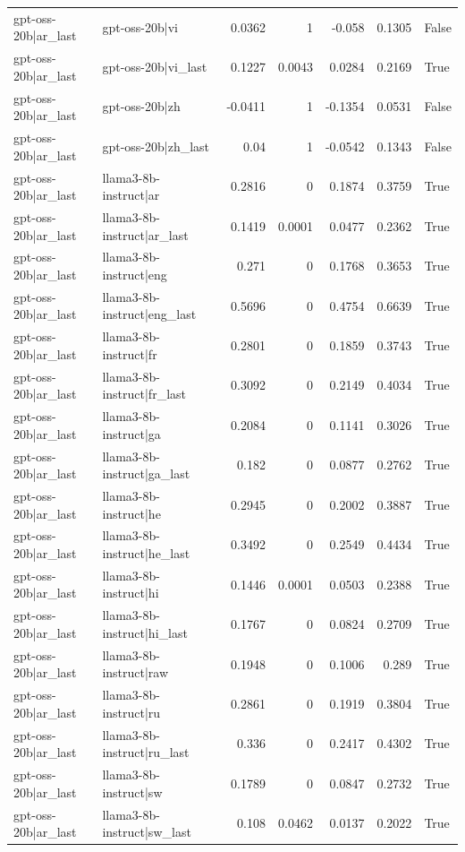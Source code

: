 \begin{table}
\begin{tabular}{l l r r r r l}
gpt-oss-20b|ar_last & gpt-oss-20b|vi & 0.0362 & 1 & -0.058 & 0.1305 & False \\
gpt-oss-20b|ar_last & gpt-oss-20b|vi_last & 0.1227 & 0.0043 & 0.0284 & 0.2169 & True \\
gpt-oss-20b|ar_last & gpt-oss-20b|zh & -0.0411 & 1 & -0.1354 & 0.0531 & False \\
gpt-oss-20b|ar_last & gpt-oss-20b|zh_last & 0.04 & 1 & -0.0542 & 0.1343 & False \\
gpt-oss-20b|ar_last & llama3-8b-instruct|ar & 0.2816 & 0 & 0.1874 & 0.3759 & True \\
gpt-oss-20b|ar_last & llama3-8b-instruct|ar_last & 0.1419 & 0.0001 & 0.0477 & 0.2362 & True \\
gpt-oss-20b|ar_last & llama3-8b-instruct|eng & 0.271 & 0 & 0.1768 & 0.3653 & True \\
gpt-oss-20b|ar_last & llama3-8b-instruct|eng_last & 0.5696 & 0 & 0.4754 & 0.6639 & True \\
gpt-oss-20b|ar_last & llama3-8b-instruct|fr & 0.2801 & 0 & 0.1859 & 0.3743 & True \\
gpt-oss-20b|ar_last & llama3-8b-instruct|fr_last & 0.3092 & 0 & 0.2149 & 0.4034 & True \\
gpt-oss-20b|ar_last & llama3-8b-instruct|ga & 0.2084 & 0 & 0.1141 & 0.3026 & True \\
gpt-oss-20b|ar_last & llama3-8b-instruct|ga_last & 0.182 & 0 & 0.0877 & 0.2762 & True \\
gpt-oss-20b|ar_last & llama3-8b-instruct|he & 0.2945 & 0 & 0.2002 & 0.3887 & True \\
gpt-oss-20b|ar_last & llama3-8b-instruct|he_last & 0.3492 & 0 & 0.2549 & 0.4434 & True \\
gpt-oss-20b|ar_last & llama3-8b-instruct|hi & 0.1446 & 0.0001 & 0.0503 & 0.2388 & True \\
gpt-oss-20b|ar_last & llama3-8b-instruct|hi_last & 0.1767 & 0 & 0.0824 & 0.2709 & True \\
gpt-oss-20b|ar_last & llama3-8b-instruct|raw & 0.1948 & 0 & 0.1006 & 0.289 & True \\
gpt-oss-20b|ar_last & llama3-8b-instruct|ru & 0.2861 & 0 & 0.1919 & 0.3804 & True \\
gpt-oss-20b|ar_last & llama3-8b-instruct|ru_last & 0.336 & 0 & 0.2417 & 0.4302 & True \\
gpt-oss-20b|ar_last & llama3-8b-instruct|sw & 0.1789 & 0 & 0.0847 & 0.2732 & True \\
gpt-oss-20b|ar_last & llama3-8b-instruct|sw_last & 0.108 & 0.0462 & 0.0137 & 0.2022 & True \\

\end{tabular}
\end{table}
